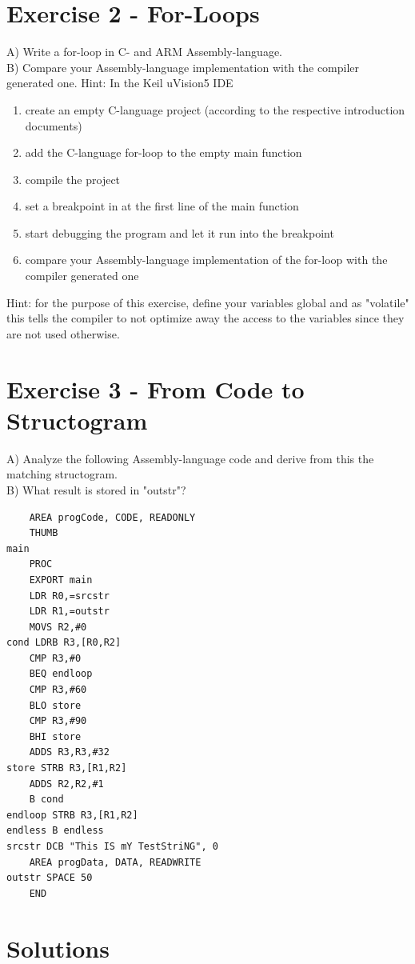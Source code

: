 \documentclass[10pt]{article}
\begin{document}
\section*{Exercise 2 - For-Loops}
A) Write a for-loop in C- and ARM Assembly-language.\\
B) Compare your Assembly-language implementation with the compiler generated one. Hint: In the Keil uVision5 IDE

\begin{enumerate}
  \item create an empty C-language project (according to the respective introduction documents)
  \item add the C-language for-loop to the empty main function
  \item compile the project
  \item set a breakpoint in at the first line of the main function
  \item start debugging the program and let it run into the breakpoint
  \item compare your Assembly-language implementation of the for-loop with the compiler generated one
\end{enumerate}

Hint: for the purpose of this exercise, define your variables global and as "volatile" this tells the compiler to not optimize away the access to the variables since they are not used otherwise.

\section*{Exercise 3 - From Code to Structogram}
A) Analyze the following Assembly-language code and derive from this the matching structogram.\\
B) What result is stored in "outstr"?

\begin{verbatim}
    AREA progCode, CODE, READONLY
    THUMB
main
    PROC
    EXPORT main
    LDR R0,=srcstr
    LDR R1,=outstr
    MOVS R2,#0
cond LDRB R3,[R0,R2]
    CMP R3,#0
    BEQ endloop
    CMP R3,#60
    BLO store
    CMP R3,#90
    BHI store
    ADDS R3,R3,#32
store STRB R3,[R1,R2]
    ADDS R2,R2,#1
    B cond
endloop STRB R3,[R1,R2]
endless B endless
srcstr DCB "This IS mY TestStriNG", 0
    AREA progData, DATA, READWRITE
outstr SPACE 50
    END
\end{verbatim}

\section*{Solutions}
\end{document}
